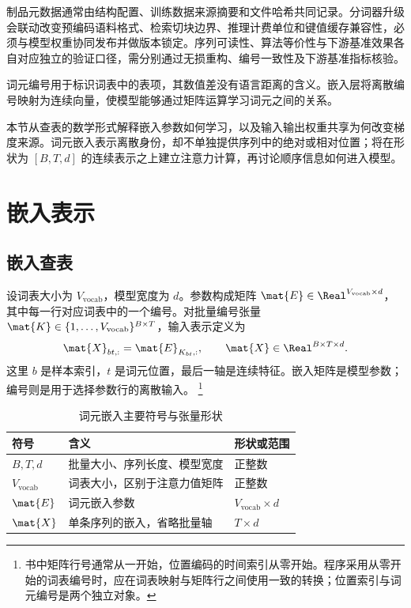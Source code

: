 \documentclass[../textbook.tex]{subfiles}
\begin{document}
制品元数据通常由结构配置、训练数据来源摘要和文件哈希共同记录。分词器升级会联动改变预编码语料格式、检索切块边界、推理计费单位和键值缓存兼容性，必须与模型权重协同发布并做版本锁定。序列可读性、算法等价性与下游基准效果各自对应独立的验证口径，需分别通过无损重构、编号一致性及下游基准指标核验。








词元编号用于标识词表中的表项，其数值差没有语言距离的含义。嵌入层将离散编号映射为连续向量，使模型能够通过矩阵运算学习词元之间的关系。

本节从查表的数学形式解释嵌入参数如何学习，以及输入输出权重共享为何改变梯度来源。词元嵌入表示离散身份，却不单独提供序列中的绝对或相对位置；将在形状为 $[B,T,d]$ 的连续表示之上建立注意力计算，再讨论顺序信息如何进入模型。

\section{嵌入表示}
\label{ch:embeddings}

\subsection{嵌入查表}
设词表大小为 $V_{\mathrm{vocab}}$，模型宽度为 $d$。参数构成矩阵 $\mat{E}\in\Real^{V_{\mathrm{vocab}}\times d}$，其中每一行对应词表中的一个编号。对批量编号张量 $\mat{K}\in\{1,\ldots,V_{\mathrm{vocab}}\}^{B\times T}$，输入表示定义为
\begin{equation}
 \mat{X}_{bt,:}=\mat{E}_{K_{bt},:},\qquad \mat{X}\in\Real^{B\times T\times d}.
 \label{eq:repr-lookup}
\end{equation}
这里 $b$ 是样本索引，$t$ 是词元位置，最后一轴是连续特征。嵌入矩阵是模型参数；编号则是用于选择参数行的离散输入。
\footnote{书中矩阵行号通常从一开始，位置编码的时间索引从零开始。程序采用从零开始的词表编号时，应在词表映射与矩阵行之间使用一致的转换；位置索引与词元编号是两个独立对象。}

\begin{table}[htbp]
\centering
\caption{词元嵌入主要符号与张量形状}
\label{tab:repr-embedding-symbols}
\begin{tabularx}{\linewidth}{@{}lXl@{}}
\toprule 符号 & 含义 & 形状或范围\\\midrule
$B,T,d$ & 批量大小、序列长度、模型宽度 & 正整数\\
$V_{\mathrm{vocab}}$ & 词表大小，区别于注意力值矩阵 & 正整数\\
$\mat{E}$ & 词元嵌入参数 & $V_{\mathrm{vocab}}\times d$\\
$\mat{X}$ & 单条序列的嵌入，省略批量轴 & $T\times d$\\
\bottomrule
\end{tabularx}
\end{table}
\end{document}
